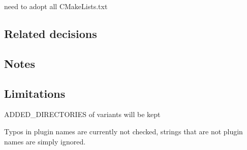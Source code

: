 \begin{DoxyItemize}
\item need to adopt all C\+Make\+Lists.\+txt
\end{DoxyItemize}

\subsection*{Related decisions}

\subsection*{Notes}

\subsection*{Limitations}


\begin{DoxyItemize}
\item {\ttfamily A\+D\+D\+E\+D\+\_\+\+D\+I\+R\+E\+C\+T\+O\+R\+I\+ES} of variants will be kept
\item Typos in plugin names are currently not checked, strings that are not plugin names are simply ignored. 
\end{DoxyItemize}